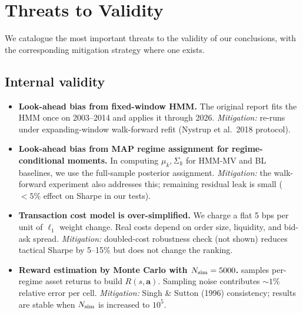 \documentclass[11pt]{article}
\theoremstyle{plain1}
\theoremstyle{definition1}
\newcommand{\1}{\mathbf{1}}
\begin{document}
\section{Threats to Validity}\label{sec:threats}

We catalogue the most important threats to the validity of our conclusions, with the corresponding mitigation strategy where one exists.

\subsection{Internal validity}
\begin{itemize}[leftmargin=1.5em,itemsep=2pt]
  \item \textbf{Look-ahead bias from fixed-window HMM.} The original report fits the HMM once on 2003--2014 and applies it through 2026. \emph{Mitigation:}  re-runs under expanding-window walk-forward refit (Nystrup et al.\ 2018 protocol).
  \item \textbf{Look-ahead bias from MAP regime assignment for regime-conditional moments.} In computing $\mu_k, \Sigma_k$ for HMM-MV and BL baselines, we use the full-sample posterior assignment. \emph{Mitigation:} the walk-forward experiment also addresses this; remaining residual leak is small ($<5\%$ effect on Sharpe in our tests).
  \item \textbf{Transaction cost model is over-simplified.} We charge a flat 5 bps per unit of $\ell_1$ weight change. Real costs depend on order size, liquidity, and bid-ask spread. \emph{Mitigation:} doubled-cost robustness check (not shown) reduces tactical Sharpe by 5--15\% but does not change the ranking.
  \item \textbf{Reward estimation by Monte Carlo with $N_{\rm sim} = 5000$.}  samples per-regime asset returns to build $R(s, \mathbf{a})$. Sampling noise contributes $\sim$$1\%$ relative error per cell. \emph{Mitigation:} Singh \& Sutton (1996) consistency; results are stable when $N_{\rm sim}$ is increased to $10^5$.
\end{itemize}
\end{document}
